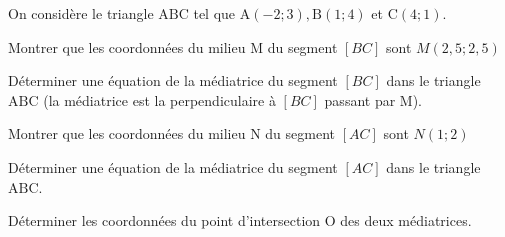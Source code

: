 \documentclass[12pt,a4paper]{article}  %
\begin{document}
On considère le triangle $\mathrm{ABC}$ tel que $\mathrm{A}(-2 ;3), \mathrm{B}(1 ; 4)$ et $\mathrm{C}(4 ; 1)$.
\begin{enumMet}
    \item Montrer que les coordonnées du milieu M du segment $[BC]$ sont $M(2,5;2,5)$
    \item Déterminer une équation de la médiatrice  du segment $[BC]$ dans le triangle $\mathrm{ABC}$ (la médiatrice est la perpendiculaire à $[BC]$ passant par M).
    \item Montrer que les coordonnées du milieu N du segment $[AC]$ sont $N(1;2)$
    \item Déterminer une équation de la médiatrice  du segment $[AC]$ dans le triangle $\mathrm{ABC}$.
    \item Déterminer les coordonnées du point d'intersection $\mathrm{O}$ des deux médiatrices.

\end{enumMet}
\end{document}
